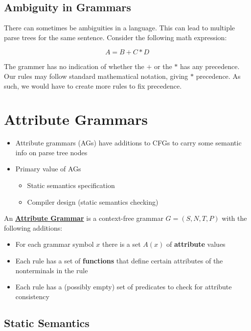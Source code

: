 \documentclass[12pt]{article}
\newcommand{\definition}[1]{\underline{\textbf{#1}}}
\begin{document}
\subsection{Ambiguity in Grammars}

There can sometimes be ambiguities in a language.
This can lead to multiple parse trees for the same sentence.
Consider the following math expression:

\begin{equation*}
  A = B+C*D
\end{equation*}

The grammer has no indication of whether the $+$ or the $*$ has any precedence.
Our rules may follow standard mathematical notation, giving $*$ precedence.
As such, we would have to create more rules to fix precedence.


\section{Attribute Grammars}

\begin{itemize}
  \item Attribute grammars (AGs) have additions to CFGs to carry some semantic info on parse tree nodes
  \item Primary value of AGs
  \begin{itemize}
    \item Static semantics specification
    \item Compiler design (static semantics checking)
  \end{itemize}
\end{itemize}

An \definition{Attribute Grammar} is a context-free grammar $G = (S, N, T, P)$ with the following additions:
\begin{itemize}
  \item For each grammar symbol $x$ there is a set $A(x)$ of \textbf{attribute} values
  \item Each rule has a set of \textbf{functions} that define certain attributes of the nonterminals in the rule
  \item Each rule has a (possibly empty) set of  predicates to check for attribute consistency
\end{itemize}

\subsection{Static Semantics}
\end{document}
